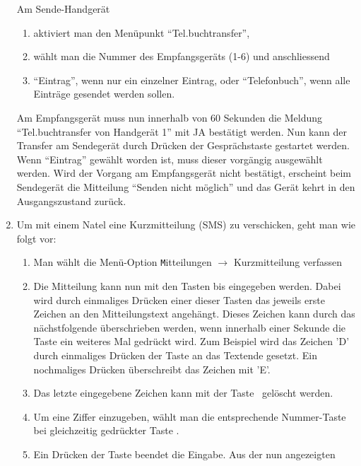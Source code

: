 \begin{enumerate}
  Am Sende-Handgerät
  \begin{enumerate}
  \item aktiviert man den Menüpunkt ``Tel.buchtransfer'',
  \item wählt man die Nummer des Empfangsgeräts (1-6) und anschliessend
  \item ``Eintrag'', wenn nur ein einzelner Eintrag,
    oder ``Telefonbuch'', wenn alle Einträge gesendet werden sollen.
  \end{enumerate}
  Am Empfangsgerät muss nun innerhalb von 60 Sekunden die Meldung
  ``Tel.buchtransfer von Handgerät 1'' mit JA bestätigt werden.
  Nun kann der Transfer am Sendegerät durch Drücken der
  Gesprächstaste gestartet werden. Wenn ``Eintrag'' gewählt worden
  ist, muss dieser vorgängig ausgewählt werden.
  Wird der Vorgang am
  Empfangsgerät nicht bestätigt, erscheint beim Sendegerät
  die Mitteilung ``Senden nicht möglich'' und das Gerät
  kehrt in den Ausgangszustand zurück.
\newslide
\item Um mit einem Natel eine Kurzmitteilung (SMS) zu verschicken, geht
 man wie folgt vor:
  \begin{enumerate}
  \item Man wählt die Menü-Option 
    {\texttt Mitteilungen $\longrightarrow$ Kurzmitteilung verfassen}
  \item Die Mitteilung kann nun mit den Tasten 
     bis
    eingegeben werden. 
    Dabei wird durch einmaliges
    Drücken einer dieser Tasten das jeweils erste Zeichen an den 
    Mitteilungstext angehängt.
    Dieses Zeichen kann durch das nächstfolgende überschrieben werden, 
    wenn innerhalb einer Sekunde die Taste
    ein weiteres Mal gedrückt wird. Zum Beispiel wird
    das Zeichen 'D' durch einmaliges Drücken der Taste 
    an das Textende gesetzt. Ein nochmaliges Drücken überschreibt das Zeichen mit 'E'.
   \item Das letzte eingegebene Zeichen kann mit der Taste 
      \ gelöscht werden.
   \item Um eine Ziffer einzugeben, wählt man die entsprechende 
     Nummer-Taste bei gleichzeitig
    gedrückter Taste \framebox{\bfseries \#\ }.
   \item Ein Drücken der Taste \framebox{
       \raisebox{0.5ex}{\rule{0.8cm}{2pt}} }
    beendet die 
    Eingabe. Aus der nun angezeigten

\end{enumerate}
\end{enumerate}

